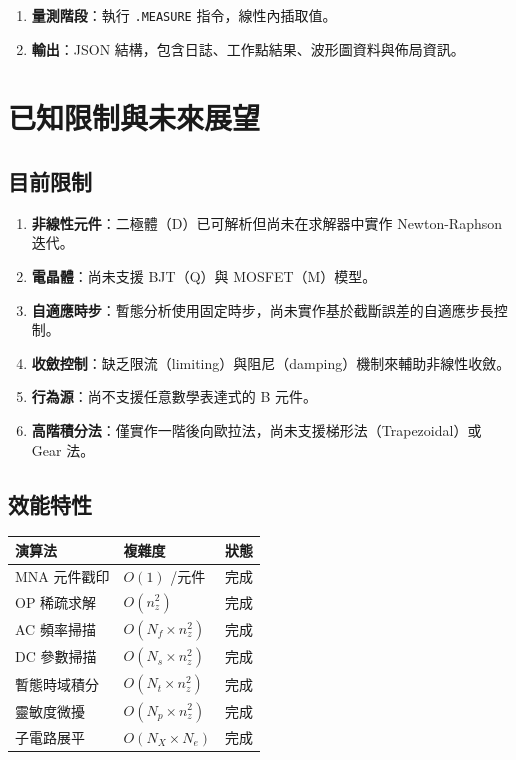 \documentclass[12pt,a4paper]{article}
\begin{document}
\begin{enumerate}
  \item \textbf{量測階段}：執行 \texttt{.MEASURE} 指令，線性內插取值。

  \item \textbf{輸出}：JSON 結構，包含日誌、工作點結果、波形圖資料與佈局資訊。
\end{enumerate}


\section{已知限制與未來展望}

\subsection{目前限制}

\begin{enumerate}
  \item \textbf{非線性元件}：二極體（D）已可解析但尚未在求解器中實作 Newton-Raphson 迭代。
  \item \textbf{電晶體}：尚未支援 BJT（Q）與 MOSFET（M）模型。
  \item \textbf{自適應時步}：暫態分析使用固定時步，尚未實作基於截斷誤差的自適應步長控制。
  \item \textbf{收斂控制}：缺乏限流（limiting）與阻尼（damping）機制來輔助非線性收斂。
  \item \textbf{行為源}：尚不支援任意數學表達式的 B 元件。
  \item \textbf{高階積分法}：僅實作一階後向歐拉法，尚未支援梯形法（Trapezoidal）或 Gear 法。
\end{enumerate}

\subsection{效能特性}

\begin{center}
\begin{tabular}{llc}
\toprule
\textbf{演算法} & \textbf{複雜度} & \textbf{狀態} \\
\midrule
MNA 元件戳印 & $O(1)$ /元件 & 完成 \\
OP 稀疏求解 & $O(n_z^2)$ & 完成 \\
AC 頻率掃描 & $O(N_f \times n_z^2)$ & 完成 \\
DC 參數掃描 & $O(N_s \times n_z^2)$ & 完成 \\
暫態時域積分 & $O(N_t \times n_z^2)$ & 完成 \\
靈敏度微擾 & $O(N_p \times n_z^2)$ & 完成 \\
子電路展平 & $O(N_X \times N_e)$ & 完成 \\
\bottomrule
\end{tabular}
\end{center}
\end{document}

